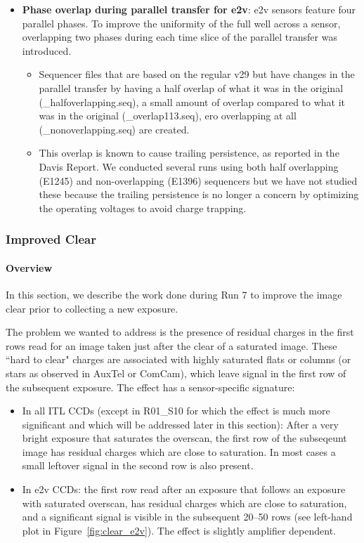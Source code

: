\begin{itemize}
\item {\bf Phase overlap during parallel transfer for e2v}: e2v sensors feature four parallel phases. To improve the uniformity of the full well across a sensor, overlapping two phases during each time slice of the parallel transfer was introduced.
\begin{itemize}
    \item Sequencer files that are based on the regular v29 but have changes in the parallel transfer by having a half overlap of what it was in the original (\_halfoverlapping.seq), a small amount of overlap compared to what it was in the original (\_overlap113.seq), ero overlapping at all (\_nonoverlapping.seq) are created.
    \item This overlap is known to cause trailing persistence, as reported in the Davis Report. We conducted several runs using both half overlapping (E1245) and non-overlapping (E1396) sequencers but we have not studied these because the trailing persistence is no longer a concern by optimizing the operating voltages to avoid charge trapping. 
\end{itemize}


\end{itemize}

\subsubsection{Improved Clear}\label{sec:improved-clear}

\paragraph{Overview}\label{overview}

In this section, we describe the work done during Run 7 to improve
the image clear prior to collecting a new exposure.

The problem we wanted to address is the presence of residual charges in
the first rows read for an image taken just after the clear of a saturated
image. These ``hard to clear" charges are associated with highly
saturated flats or columns (or stars as observed in AuxTel or ComCam),
which leave signal in the first row of the subsequent exposure. The effect has a sensor-specific signature:

\begin{itemize}
\item
  In all ITL CCDs (except in R01\_S10 for which
  the effect is much more significant and which will be addressed later
  in this section): After a very bright exposure that saturates the overscan, the first row of the subseqeunt image has residual charges which are close to saturation. In most cases a small leftover signal in the second row is also present.
\item
  In e2v CCDs: the first row read after an exposure that follows an exposure with saturated
  overscan, has residual charges which are close to saturation, and a significant signal is visible
  in the subsequent 20--50 rows (see left-hand plot in Figure~\ref{fig:clear_e2v}).
  The effect is slightly amplifier dependent.
\end{itemize}

